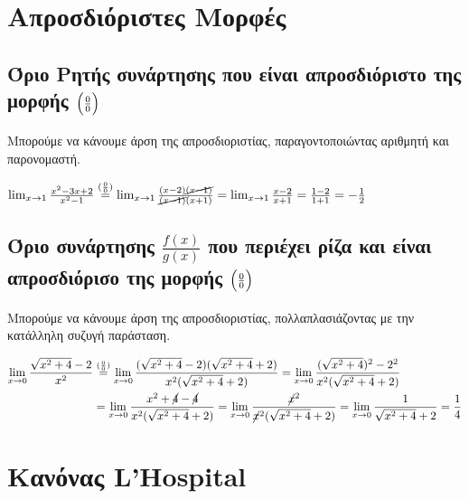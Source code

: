 \section*{Απροσδιόριστες Μορφές}

\subsection*{Όριο Ρητής συνάρτησης που είναι απροσδιόριστο της μορφής $\Bigl(\frac{0}{0}\Bigr) $}
 
Μπορούμε να κάνουμε άρση της απροσδιοριστίας, παραγοντοποιώντας αριθμητή και παρονομαστή.

\begin{example}
  $ \lim_{x \to 1} \frac{x^{2}-3x+2}{x^{2}-1} \overset{(\frac{0}{0})}{=} \lim_{x \to 1}
  \frac{(x-2)\cancel{(x-1)}}{\cancel{(x-1)}(x+1)} = \lim_{x \to 1} \frac{x-2}{x+1} = 
  \frac{1-2}{1+1} = - \frac{1}{2} $
\end{example}


\subsection*{Όριο συνάρτησης $ \frac{f(x)}{g(x)} $ που περιέχει ρίζα και είναι
απροσδιόρισο της μορφής $\Bigl(\frac{0}{0}\Bigr)$}

Μπορούμε να κάνουμε άρση της απροσδιοριστίας, πολλαπλασιάζοντας με την κατάλληλη 
συζυγή παράσταση.


 

\begin{example}
  \begin{align*}
    \lim_{x \to 0} \frac{\sqrt{x^{2}+4} - 2}{x^{2}} 
    &\overset{(\frac{0}{0})}{=}  
    \lim_{x \to 0} \frac{(\sqrt{x^{2}+4} -2)(\sqrt{x^{2}+4} +2)}{x^{2}(\sqrt{x^{2}+4} +2)}
    = \lim_{x \to 0} \frac{(\sqrt{x^{2}+4})^{2}-2^{2}}{x^{2}(\sqrt{x^{2}+4} +2)} \\ 
    &= \lim_{x \to 0} \frac{x^{2}+\cancel{4}-\cancel{4}}{x^{2}(\sqrt{x^{2}+4} +2)} =
    \lim_{x \to 0} \frac{\cancel{x}^{2}}{\cancel{x}^{2}(\sqrt{x^{2}+4} +2)} = \lim_{x \to 0} \frac{1}{\sqrt{x^{2}+4} +2} = \frac{1}{4}  
  \end{align*}
\end{example}


\section*{Κανόνας L'Hospital}

